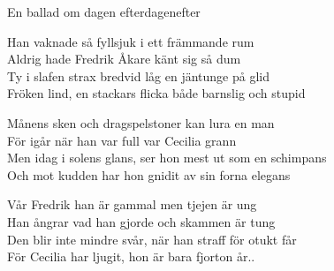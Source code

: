\begin{song}{En ballad om dagen efter}{dagenefter}
\begin{vers}
Han vaknade så fyllsjuk i ett främmande rum\\
Aldrig hade Fredrik Åkare känt sig så dum\\
Ty i slafen strax bredvid låg en jäntunge på glid\\
Fröken lind, en stackars flicka både barnslig och stupid\\
\end{vers}
\begin{vers}
Månens sken och dragspelstoner kan lura en man\\
För igår när han var full var Cecilia grann\\
Men idag i solens glans, ser hon mest ut som en schimpans\\
Och mot kudden har hon gnidit av sin forna elegans\\
\end{vers}
\begin{vers}
Vår Fredrik han är gammal men tjejen är ung\\
Han ångrar vad han gjorde och skammen är tung\\
Den blir inte mindre svår, när han straff för otukt får\\
För Cecilia har ljugit, hon är bara fjorton år..\\
\end{vers}
\end{song}
